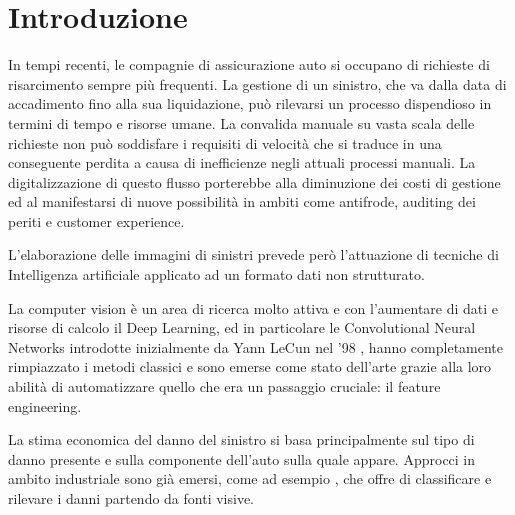 



\chapter*{Introduzione}

In tempi recenti, le compagnie di assicurazione auto si occupano di richieste di risarcimento sempre più frequenti. La gestione di un sinistro, che va dalla data di accadimento fino alla sua liquidazione, può rilevarsi un processo dispendioso in termini di tempo e risorse umane. La convalida manuale su vasta scala delle richieste non può soddisfare i requisiti di velocità che si traduce in una conseguente perdita \cite{eyclaimsleakage} a causa di inefficienze negli attuali processi manuali.
La digitalizzazione di questo flusso porterebbe alla diminuzione dei costi di gestione ed al manifestarsi di nuove possibilità in ambiti come antifrode, auditing dei periti e customer experience.

L'elaborazione delle immagini di sinistri prevede però l'attuazione di tecniche di Intelligenza artificiale applicato ad un formato dati non strutturato.

La computer vision è un area di ricerca molto attiva e con l'aumentare di dati e risorse di calcolo il Deep Learning, ed in particolare le Convolutional Neural Networks introdotte inizialmente da Yann LeCun nel '98 \cite{lecun1998gradient}, hanno completamente rimpiazzato i metodi classici e sono emerse come stato dell'arte \cite{krizhevsky2012imagenet} grazie alla loro abilità di automatizzare quello che era un passaggio cruciale: il feature engineering.

La stima economica del danno del sinistro si basa principalmente sul tipo di danno presente e sulla componente dell'auto sulla quale appare. Approcci in ambito industriale sono già emersi, come ad esempio \cite{tractable}, che offre di classificare e rilevare i danni partendo da fonti visive.


